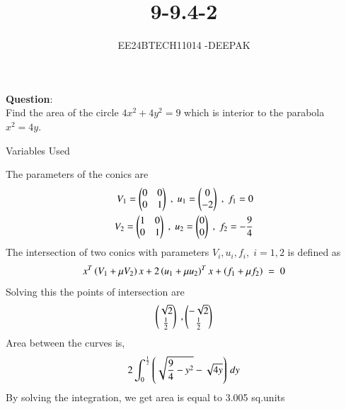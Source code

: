 \documentclass[journal]{IEEEtran}
\begin{document}

\vspace{3cm}

\title{9-9.4-2}
\author{EE24BTECH11014 -DEEPAK}
{\let\newpage\relax\maketitle}

\renewcommand{\thefigure}{\theenumi}
\renewcommand{\thetable}{\theenumi}
\setlength{\intextsep}{10pt} %


\renewcommand{\thetable}{\theenumi}
\textbf{Question}:\\
Find the area of the circle $ 4x^2 + 4y^2 = 9$ which is interior to the parabola $x^2 = 4y.$
\\
\solution
\begin{table}[h!]    
  \centering
  
  \caption{Variables Used}
\end{table}
The parameters of the conics are
\begin{align}
V_1=\begin{pmatrix}0 & 0 \\ 0 & 1\end{pmatrix}\;,\;u_1=\begin{pmatrix}0\\-2\end{pmatrix} \;,\;f_1=0\\
V_2=\begin{pmatrix}1 & 0 \\ 0 & 1\end{pmatrix}\;,\;u_2=\begin{pmatrix}0\\0\end{pmatrix}\;,\;f_2=-\frac{9}{4}
\end{align}
The intersection of two conics with parameters $V_i,u_i,f_i,\;i= 1,2$ is defined as
\begin{align}
x^T\left(V_1+\mu V_2\right)x+2\left(u_1+\mu u_2\right)^T x + \left(f_1+\mu f_2\right)\;=\;0
\end{align}
Solving this the points of intersection are
\begin{align}
\begin{pmatrix}\sqrt{2}\\\frac{1}{2}\end{pmatrix}\;,\begin{pmatrix}-\sqrt{2}\\\frac{1}{2}\end{pmatrix}
\end{align}
Area between the curves is,
\begin{align}
2\int_{0}^{\frac{1}{2}} \left(\sqrt{\frac{9}{4}-y^2}-\sqrt{4y}\right) \, dy 
\end{align}
By solving the integration, we get area is equal to 3.005 sq.units
\end{document}
